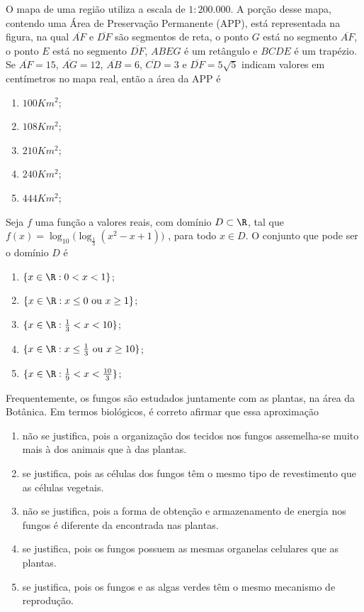 \documentclass[twocolumn,landscape]{amsart}
\begin{document}
\begin{questao}
  O mapa de uma região utiliza a escala de $1:200.000$. A porção desse
  mapa, contendo uma Área de Preservação Permanente (APP), está
  representada na figura, na qual $\overline{AF}$ e $\overline{DF}$ são
  segmentos de reta, o ponto $G$ está no segmento $\overline{AF}$, o
  ponto $E$ está no segmento $\overline{DF}$, $ABEG$ é um retângulo e
  $BCDE$ é um trapézio. Se $\overline{AF}=15$, $\overline{AG}=12$,
  $\overline{AB}=6$, $\overline{CD}=3$ e $\overline{DF}=5\sqrt{5}$
  indicam valores em centímetros no mapa real, então a área da APP é
  \begin{enumerate}[\bf a.]
    \item $100 Km^2$;
    \item $108 Km^2$;
    \item $210 Km^2$;
    \item $240 Km^2$;
    \item $444 Km^2$; %
  \end{enumerate}
\end{questao}
\clearpage

\begin{questao}
  Seja $f$ uma função a valores reais, com domínio $D\subset\R$, tal que
  $f(x)=\log_{10}\big(\log_{\frac{1}{3}}(x^2-x+1)\big)$ , para todo
  $x\in D$. O conjunto que pode ser o domínio $D$ é
  \begin{enumerate}[\bf a.]
    \item $\{x\in\R: 0<x<1\}$; %
    \item $\{x\in\R: x\leq 0\mbox{ ou } x\geq 1\}$;
    \item $\{x\in\R: \frac{1}{3}<x<10\}$;
    \item $\{x\in\R: x\leq \frac{1}{3}\mbox{ ou } x\geq 10\}$;
    \item $\{x\in\R: \frac{1}{9}<x<\frac{10}{3}\}$;
  \end{enumerate}
\end{questao}
\clearpage

\begin{questao}
  Frequentemente, os fungos são estudados juntamente com as plantas, na
  área da Botânica. Em termos biológicos, é correto afirmar que essa
  aproximação
  \begin{enumerate}[\bf a.]
    \item não se justifica, pois a organização dos tecidos nos fungos
    assemelha-se muito mais à dos animais que à das plantas.
    \item se justifica, pois as células dos fungos têm o mesmo tipo de
    revestimento que as células vegetais.
    \item não se justifica, pois a forma de obtenção e armazenamento de
    energia nos fungos é diferente da encontrada nas plantas. %
    \item se justifica, pois os fungos possuem as mesmas organelas
    celulares que as plantas.
    \item se justifica, pois os fungos e as algas verdes têm o mesmo
    mecanismo de reprodução.
  \end{enumerate}
\end{questao}
\clearpage
\end{document}
